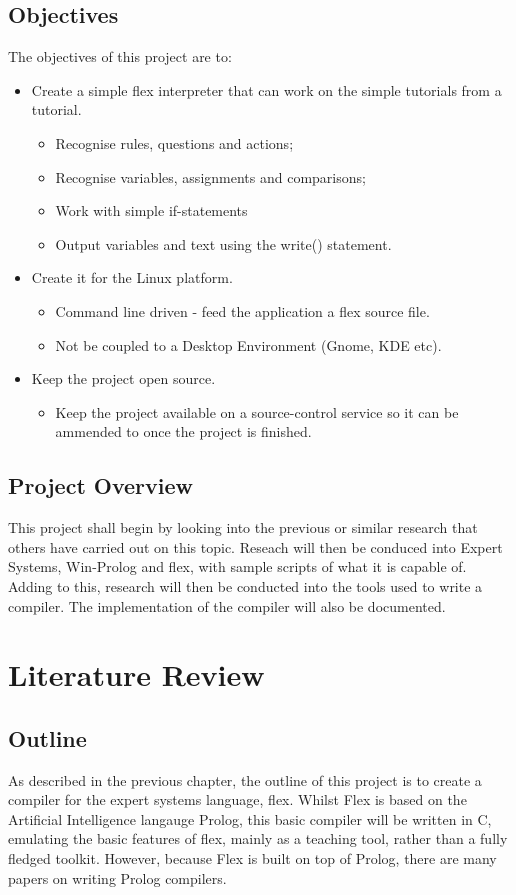 \documentclass[12pt]{report}
\begin{document}
\section{Objectives}\label{sec:objectives}
The objectives of this project are to:
\begin{itemize}
\item Create a simple flex interpreter that can work on the simple tutorials from a tutorial.
	\begin{itemize}
	\item Recognise rules, questions and actions;
	\item Recognise variables, assignments and comparisons;
	\item Work with simple if-statements
	\item Output variables and text using the write() statement.
	\end{itemize}
\item Create it for the Linux platform.
	\begin{itemize}
	\item Command line driven - feed the application a flex source file.
	\item Not be coupled to a Desktop Environment (Gnome, KDE etc).
	\end{itemize}
\item Keep the project open source.
	\begin{itemize}
	\item Keep the project available on a source-control service so it can be ammended to once the project is finished.
	\end{itemize}
\end{itemize}

\section{Project Overview}\label{sec:project_overview}
This project shall begin by looking into the previous or similar research that others have carried out on this topic.  Reseach will then be conduced into Expert Systems, Win-Prolog and flex, with sample scripts of what it is capable of.  Adding to this, research will then be conducted into the tools used to write a compiler.  The implementation of the compiler will also be documented.

\chapter{Literature Review}
\section{Outline}\label{sec:outline}
As described in the previous chapter, the outline of this project is to create a compiler for the expert systems language, flex.  Whilst Flex is based on the Artificial Intelligence langauge Prolog, this basic compiler will be written in C, emulating the basic features of flex, mainly as a teaching tool, rather than a fully fledged toolkit.  However, because Flex is built on top of Prolog, there are many papers on writing Prolog compilers.
\end{document}
